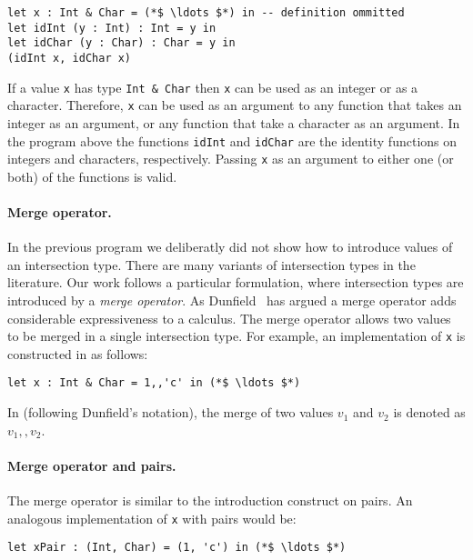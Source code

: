 \begin{lstlisting}
let x : Int & Char = (*$ \ldots $*) in -- definition ommitted
let idInt (y : Int) : Int = y in
let idChar (y : Char) : Char = y in
(idInt x, idChar x)
\end{lstlisting}

\noindent If a value \lstinline{x} has type \lstinline{Int & Char} then
\lstinline{x} can be used as an integer or as a character. Therefore,
\lstinline{x} can be used as an argument to any function that takes
an integer as an argument, or any
function that take a character as an argument. In the program above
the functions \lstinline{idInt} and \lstinline{idChar} are the
identity functions on integers and characters, respectively.
Passing \lstinline{x} as an argument to either one (or both) of the
functions is valid.

\paragraph{Merge operator.}
In the previous program we deliberatly did not show how to introduce values of an
intersection type. There are many variants of intersection types
in the literature. Our work follows a particular formulation, where
intersection types are introduced by a \emph{merge operator}.
As Dunfield~\cite{dunfield2014elaborating} has argued a merge operator adds considerable
expressiveness to a calculus. The merge operator allows
two values to be merged in a single intersection type. For example, an
implementation of \lstinline{x} is constructed in \namedis as follows:

\begin{lstlisting}
let x : Int & Char = 1,,'c' in (*$ \ldots $*)
\end{lstlisting}

\noindent In \namedis (following Dunfield's notation), the
merge of two values $v_1$ and $v_2$ is denoted as $v_1 ,, v_2$.

\paragraph{Merge operator and pairs.}
The merge operator is similar to the introduction construct on pairs.
An analogous implementation of \lstinline{x} with pairs would be:

\begin{lstlisting}
let xPair : (Int, Char) = (1, 'c') in (*$ \ldots $*)
\end{lstlisting}

